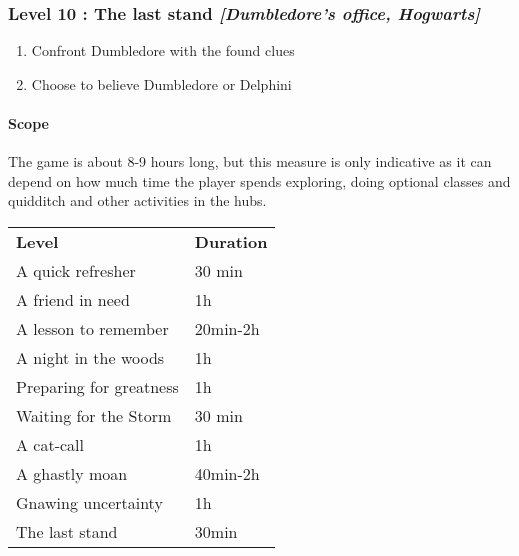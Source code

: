 \subsubsection{Level 10 : The last stand \textit{[Dumbledore's office, Hogwarts]}}
\begin{enumerate}[1)]
	\item Confront Dumbledore with the found clues
	\item Choose to believe Dumbledore or Delphini
\end{enumerate}

\clearpage

\paragraph{Scope}

The game is about 8-9 hours long, but this measure is only indicative as it can depend on how much time the player spends exploring, doing optional classes and quidditch and other activities in the hubs.

\begin{table}[htb]
\begin{tabular}{ll}
\textbf{Level}    & \textbf{Duration} \\
A quick refresher 			& 30 min             \\
A friend in need                  	& 1h                  \\
A lesson to remember         & 20min-2h                   \\
A night in the woods            & 1h                  \\
Preparing for greatness        & 1h                  \\
Waiting for the Storm          &  30 min                 \\
A cat-call                 		&  1h                 \\
A ghastly moan                   &  40min-2h                 \\
Gnawing uncertainty            &  1h                 \\
 The last stand                 	&   30min                              
\end{tabular}
\end{table}

\pagebreak
